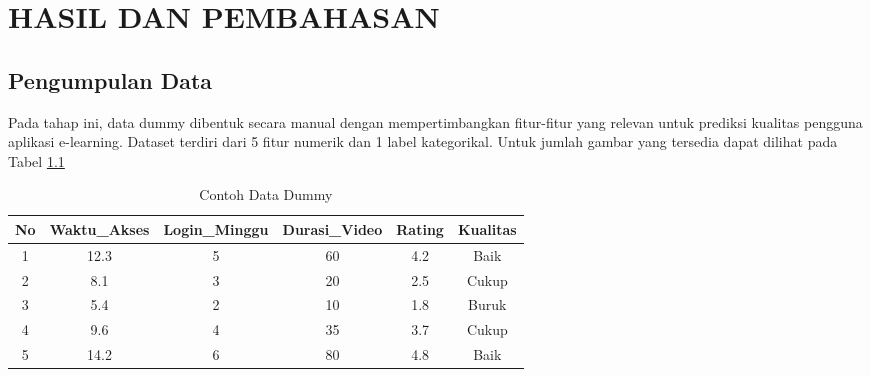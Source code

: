 \chapter{HASIL DAN PEMBAHASAN}

\section{Pengumpulan Data}
\par Pada tahap ini, data dummy dibentuk secara manual dengan mempertimbangkan fitur-fitur yang relevan untuk prediksi kualitas pengguna aplikasi e-learning. Dataset terdiri dari 5 fitur numerik dan 1 label kategorikal. Untuk jumlah gambar yang tersedia dapat dilihat pada Tabel \ref{tab:data_dummy}

\begin{table}[h]
\centering
\caption{Contoh Data Dummy}
\label{tab:data_dummy}
\begin{tabular}{|c|c|c|c|c|c|}
\hline
No & Waktu\_Akses & Login\_Minggu & Durasi\_Video & Rating & Kualitas \\
\hline
1 & 12.3 & 5 & 60 & 4.2 & Baik \\
2 & 8.1 & 3 & 20 & 2.5 & Cukup \\
3 & 5.4 & 2 & 10 & 1.8 & Buruk \\
4 & 9.6 & 4 & 35 & 3.7 & Cukup \\
5 & 14.2 & 6 & 80 & 4.8 & Baik \\
\hline
\end{tabular}
\end{table}

